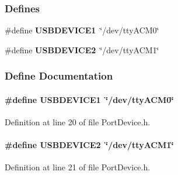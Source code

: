 \subsubsection*{\-Defines}
\begin{DoxyCompactItemize}
\item 
\#define {\bf \-U\-S\-B\-D\-E\-V\-I\-C\-E1}~\char`\"{}/dev/tty\-A\-C\-M0\char`\"{}
\item 
\#define {\bf \-U\-S\-B\-D\-E\-V\-I\-C\-E2}~\char`\"{}/dev/tty\-A\-C\-M1\char`\"{}
\end{DoxyCompactItemize}


\subsubsection{\-Define \-Documentation}
\paragraph[{\-U\-S\-B\-D\-E\-V\-I\-C\-E1}]{\setlength{\rightskip}{0pt plus 5cm}\#define {\bf \-U\-S\-B\-D\-E\-V\-I\-C\-E1}~\char`\"{}/dev/tty\-A\-C\-M0\char`\"{}}\label{_port_device_8h_a631a0def6009cb040c106884e01c39a0}


\-Definition at line 20 of file \-Port\-Device.\-h.

\paragraph[{\-U\-S\-B\-D\-E\-V\-I\-C\-E2}]{\setlength{\rightskip}{0pt plus 5cm}\#define {\bf \-U\-S\-B\-D\-E\-V\-I\-C\-E2}~\char`\"{}/dev/tty\-A\-C\-M1\char`\"{}}\label{_port_device_8h_a86976a4a7e2e2ec6c5c9dd2f9636413a}


\-Definition at line 21 of file \-Port\-Device.\-h.

